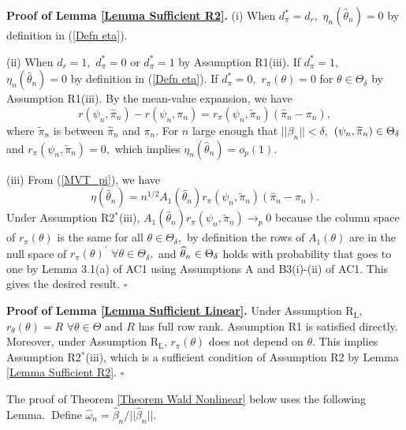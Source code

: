 \documentclass[12pt,thmsb,titlepage,final,oneside,letterpaper]{article}
\begin{document}
\noindent \textbf{Proof of Lemma \ref{Lemma Sufficient R2}. }(i) When $%
d_{\pi }^{\ast }=d_{r},$ $\eta _{n}(\widehat{\theta }_{n})=0$ by definition
in (\ref{Defn eta}).

(ii) When $d_{r}=1,$ $d_{\pi }^{\ast }=0$ or $d_{\pi }^{\ast }=1$ by
Assumption R1(iii). If $d_{\pi }^{\ast }=1,$ $\eta _{n}(\widehat{\theta }%
_{n})=0$ by definition in (\ref{Defn eta}). If $d_{\pi }^{\ast }=0,$ $r_{\pi
}(\theta )=0$ for $\theta \in \Theta _{\delta }$ by Assumption R1(iii). By
the mean-value expansion, we have%
\begin{equation}
r(\psi _{n},\widehat{\pi }_{n})-r(\psi _{n},\pi _{n})=r_{\pi }(\psi _{n},%
\widetilde{\pi }_{n})(\widehat{\pi }_{n}-\pi _{n}),  \label{MVT_pi}
\end{equation}%
where $\widetilde{\pi }_{n}$ is between $\widehat{\pi }_{n}$ and $\pi _{n}.$
For $n$ large enough that $||\beta _{n}||<\delta ,$ $(\psi _{n},\widetilde{%
\pi }_{n})\in \Theta _{\delta }$ and $r_{\pi }(\psi _{n},\widetilde{\pi }%
_{n})=0,$ which implies $\eta _{n}(\widehat{\theta }_{n})=o_{p}(1).$

(iii) From (\ref{MVT_pi}), we have%
\begin{equation}
\eta (\widehat{\theta }_{n})=n^{1/2}A_{1}(\widehat{\theta }_{n})r_{\pi
}(\psi _{n},\widetilde{\pi }_{n})(\widehat{\pi }_{n}-\pi _{n}).
\end{equation}%
Under Assumption R2$^{\ast }$(iii), $A_{1}(\widehat{\theta }_{n})r_{\pi
}(\psi _{n},\widetilde{\pi }_{n})\rightarrow _{p}0$ because the column space
of $r_{\pi }(\theta )$ is the same for all $\theta \in \Theta _{\delta },$
by definition the rows of $A_{1}(\theta )$ are in the null space of $r_{\pi
}(\theta )^{\prime }$ $\forall \theta \in \Theta _{\delta },$ and $\widehat{%
\theta }_{n}\in \Theta _{\delta }$ holds with probability that goes to one
by Lemma 3.1(a) of AC1 using Assumptions A and B3(i)-(ii) of AC1. This gives
the desired result. $\square $\bigskip

\noindent \textbf{Proof of Lemma \ref{Lemma Sufficient Linear}. }Under
Assumption R$_{\text{L}}$, $r_{\theta }(\theta )=R$ $\forall \theta \in
\Theta $ and $R$ has full row rank. Assumption R1 is satisfied directly.
Moreover, under Assumption R$_{\text{L}}$, $r_{\pi }(\theta )$ does not
depend on $\theta .$ This implies Assumption R2$^{\ast }$(iii), which is a
sufficient condition of Assumption R2 by Lemma \ref{Lemma Sufficient R2}. $%
\square $\bigskip

The proof of Theorem \ref{Theorem Wald Nonlinear} below uses the following
Lemma.\textbf{\ }Define $\widehat{\omega }_{n}=\widehat{\beta }_{n}/||%
\widehat{\beta }_{n}||.$
\end{document}
